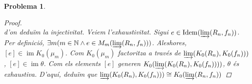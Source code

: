 \documentclass[compress]{article}
\newtheorem{problema}{Problema}
\theoremstyle{definition}
\DeclareMathOperator{\im}{im}
\DeclareMathOperator{\Idem}{Idem}
\begin{document}
\begin{problema}
\begin{enumerate}
\begin{proof}
\begin{equation*}
            \end{equation*}
            d'on deduïm la injectivitat.\newline
            Veiem l'exhaustivitat. Sigui $e\in\Idem(\varinjlim(R_{n},f_{n}))$. Per definició, $\exists m(m\in\mathbb{N}\land e\in M_{m}(\varinjlim(R_{n},f_{n})))$. Aleshores, $[e]\in\im{K_{0}(\mu_{m})}$. Com $K_{0}(\mu_{m})$ factoritza a través de $\varinjlim(K_{0}(R_{n}),K_{0}(f_{n})))$, $[e]\in\im{\theta}$. Com els elements $[e]$ generen $K_{0}(\varinjlim(K_{0}(R_{n}),K_{0}(f_{n}))))$, $\theta$ és exhaustiva.\newline
            D'aquí, deduïm que $\varinjlim(K_{0}(R_{n}),K_{0}(f_{n})))\cong K_{0}(\varinjlim(R_{n},f_{n}))$
         \end{proof}
     \end{enumerate}
\end{problema}
\end{document}
